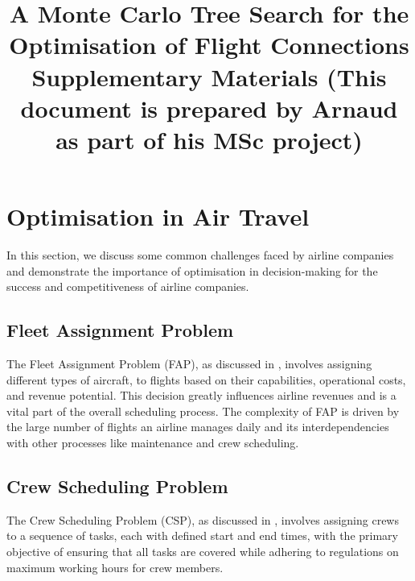 \documentclass[conference]{IEEEtran}
\begin{document}
\title{A Monte Carlo Tree Search for the
Optimisation of Flight Connections\\
{\large Supplementary Materials (This document is prepared by Arnaud as part of his MSc project)}
}

\author{
}


\maketitle

\section{Optimisation in Air Travel}

In this section, we discuss some common challenges faced by airline companies and demonstrate the importance of optimisation in decision-making for the success and competitiveness of airline companies.

\subsection{Fleet Assignment Problem}

The Fleet Assignment Problem (FAP), as discussed in \cite{airline_fleet_assignement}, involves assigning different types of aircraft, to flights based on their capabilities, operational costs, and revenue potential. This decision greatly influences airline revenues and is a vital part of the overall scheduling process. The complexity of FAP is driven by the large number of flights an airline manages daily and its interdependencies with other processes like maintenance and crew scheduling.

\subsection{Crew Scheduling Problem} %

The Crew Scheduling Problem (CSP), as discussed in \cite{crew_scheduling_problem}, involves assigning crews to a sequence of tasks, each with defined start and end times, with the primary objective of ensuring that all tasks are covered while adhering to regulations on maximum working hours for crew members.
\end{document}
